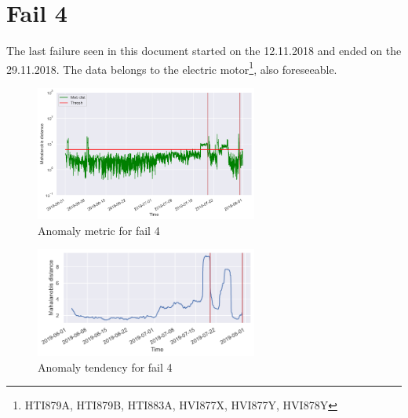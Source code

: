 \documentclass[11pt,twoside]{article}
\begin{document}
\section{Fail 4}
The last failure seen in this document started on the 12.11.2018 and ended on the 29.11.2018. The
data belongs to the electric motor\footnote{HTI879A, HTI879B, HTI883A, HVI877X, HVI877Y, HVI878Y}, also foreseeable.
\begin{figure}[h!]
\centering
\includegraphics[width=0.65\textwidth]{8_3_AM_label.png}
\caption{Anomaly metric for fail 4}\label{screenshots}
\end{figure}
\begin{figure}[h!]
\centering
\includegraphics[width=0.65\textwidth]{8_3_T_label.png}
\caption{Anomaly tendency for fail 4}\label{screenshots}
\end{figure}

\newpage
\end{document}
